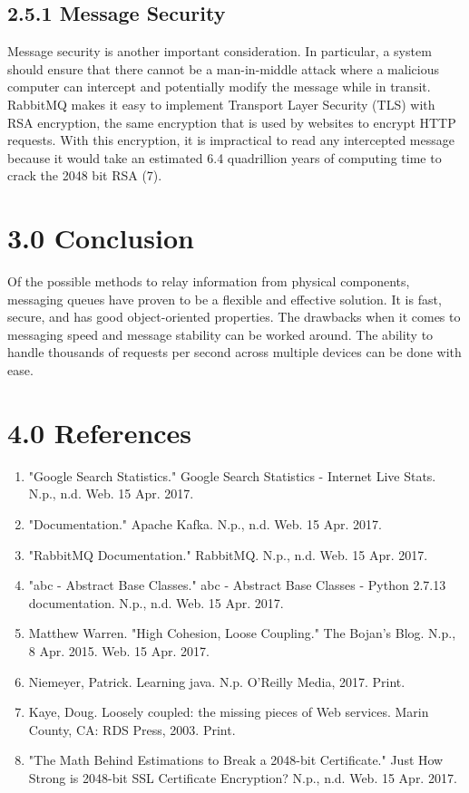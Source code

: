 \documentclass[12pt]{report}
\begin{document}
\subsection*{2.5.1 Message Security}
Message security is another important consideration. In particular, a system should ensure that there cannot be a man-in-middle attack where a malicious computer can intercept and potentially modify the message while in transit. RabbitMQ makes it easy to implement Transport Layer Security (TLS) with RSA encryption, the same encryption that is used by websites to encrypt HTTP requests. With this encryption, it is impractical to read any intercepted message because it would take an estimated 6.4 quadrillion years of computing time to crack the 2048 bit RSA (7).

\newpage\thispagestyle{fancy}\sectionfont{\scshape}
\section*{3.0 Conclusion}
\par\indent
Of the possible methods to relay information from physical components, messaging queues have proven to be a flexible and effective solution. It is fast, secure, and has good object-oriented properties. The drawbacks when it comes to messaging speed and message stability can be worked around. The ability to handle thousands of requests per second across multiple devices can be done with ease.

 \noindent

\newpage
\section*{4.0 References}

\begin{enumerate}
\item "Google Search Statistics." Google Search Statistics - Internet Live Stats. N.p., n.d. Web. 15 Apr. 2017.
\item "Documentation." Apache Kafka. N.p., n.d. Web. 15 Apr. 2017.
\item "RabbitMQ Documentation." RabbitMQ. N.p., n.d. Web. 15 Apr. 2017.
\item "abc - Abstract Base Classes." abc - Abstract Base Classes - Python 2.7.13 documentation. N.p., n.d. Web. 15 Apr. 2017.
\item Matthew Warren. "High Cohesion, Loose Coupling." The Bojan's Blog. N.p., 8 Apr. 2015. Web. 15 Apr. 2017.
\item Niemeyer, Patrick. Learning java. N.p. O'Reilly Media, 2017. Print.
\item Kaye, Doug. Loosely coupled: the missing pieces of Web services. Marin County, CA: RDS Press, 2003. Print.
\item "The Math Behind Estimations to Break a 2048-bit Certificate." Just How Strong is 2048-bit SSL Certificate Encryption? N.p., n.d. Web. 15 Apr. 2017.
\end{enumerate}
\end{document}
